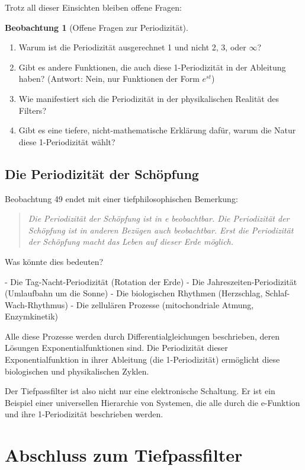 \documentclass[a4paper, 12pt, twoside, openright]{report}
\theoremstyle{definition}
\newtheorem{beobachtung}{Beobachtung}
\theoremstyle{definition}
\begin{document}
Trotz all dieser Einsichten bleiben offene Fragen:

\begin{beobachtung}[Offene Fragen zur Periodizität]
	\begin{enumerate}
		\item Warum ist die Periodizität ausgerechnet 1 und nicht 2, 3, oder $\infty$?
		\item Gibt es andere Funktionen, die auch diese 1-Periodizität in der Ableitung haben? (Antwort: Nein, nur Funktionen der Form $e^{st}$)
		\item Wie manifestiert sich die Periodizität in der physikalischen Realität des Filters?
		\item Gibt es eine tiefere, nicht-mathematische Erklärung dafür, warum die Natur diese 1-Periodizität wählt?
	\end{enumerate}
\end{beobachtung}

\subsection{Die Periodizität der Schöpfung}

Beobachtung 49 endet mit einer tiefphilosophischen Bemerkung:

\begin{quote}
	\textit{Die Periodizität der Schöpfung ist in e beobachtbar. Die Periodizität der Schöpfung ist in anderen Bezügen auch beobachtbar. Erst die Periodizität der Schöpfung macht das Leben auf dieser Erde möglich.}
\end{quote}

Was könnte dies bedeuten?

- Die Tag-Nacht-Periodizität (Rotation der Erde)
- Die Jahreszeiten-Periodizität (Umlaufbahn um die Sonne)
- Die biologischen Rhythmen (Herzschlag, Schlaf-Wach-Rhythmus)
- Die zellulären Prozesse (mitochondriale Atmung, Enzymkinetik)

Alle diese Prozesse werden durch Differentialgleichungen beschrieben, deren Lösungen Exponentialfunktionen sind. Die Periodizität dieser Exponentialfunktion in ihrer Ableitung (die 1-Periodizität) ermöglicht diese biologischen und physikalischen Zyklen.

Der Tiefpassfilter ist also nicht nur eine elektronische Schaltung. Er ist ein Beispiel einer universellen Hierarchie von Systemen, die alle durch die e-Funktion und ihre 1-Periodizität beschrieben werden.

\section{Abschluss zum Tiefpassfilter}
\end{document}
